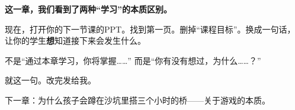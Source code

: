\begin{decision-point}
\label{decision:chap1}

\noindent\textbf{这一章，我们看到了两种“学习”的本质区别。}

\vspace{0.3cm}

\noindent 现在，打开你的下一节课的PPT。找到第一页。删掉“课程目标”。换成一句话，让你的学生\textbf{想}知道接下来会发生什么。

\noindent 不是“通过本章学习，你将掌握\ldots\ldots”
\noindent 而是“你有没有想过，为什么\ldots\ldots？”

\vspace{0.3cm}

\noindent 就这一句。改完发给我。
\end{decision-point}

\vspace{0.5cm}

\begin{flushright}
{\small\color{muted} 下一章：为什么孩子会蹲在沙坑里搭三个小时的桥——关于游戏的本质。}
\end{flushright}
